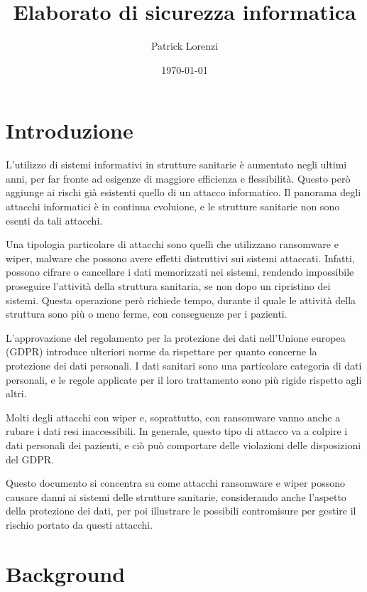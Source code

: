 \documentclass[12pt]{article}
\title{Elaborato di sicurezza informatica}
\author{Patrick Lorenzi}
\date{\today}
\begin{document}
\maketitle{}    
\newpage
\tableofcontents
\newpage

\section{Introduzione}

L'utilizzo di sistemi informativi in strutture sanitarie è aumentato negli ultimi anni, per far fronte ad esigenze di maggiore efficienza e flessibilità. Questo però aggiunge ai rischi già esistenti quello di un attacco informatico. Il panorama degli attacchi informatici è in continua evoluione, e le strutture sanitarie non sono esenti da tali attacchi. 

Una tipologia particolare di attacchi sono quelli che utilizzano ransomware e wiper, malware che possono avere effetti distruttivi sui sistemi attaccati. Infatti, possono cifrare o cancellare i dati memorizzati nei sistemi, rendendo impossibile proseguire l'attività della struttura sanitaria, se non dopo un ripristino dei sistemi. Questa operazione però richiede tempo, durante il quale le attività della struttura sono più o meno ferme, con conseguenze per i pazienti.

L'approvazione del regolamento per la protezione dei dati nell'Unione europea (GDPR) introduce ulteriori norme da rispettare per quanto concerne la protezione dei dati personali. I dati sanitari sono una particolare categoria di dati personali, e le regole applicate per il loro trattamento sono più rigide rispetto agli altri.

Molti degli attacchi con wiper e, soprattutto, con ransomware vanno anche a rubare i dati resi inaccessibili. In generale, questo tipo di attacco va a colpire i dati personali dei pazienti, e ciò può comportare delle violazioni delle disposizioni del GDPR.

Questo documento si concentra su come attacchi ransomware e wiper possono causare danni ai sistemi delle strutture sanitarie, considerando anche l'aspetto della protezione dei dati, per poi illustrare le possibili contromisure per gestire il rischio portato da questi attacchi.

\newpage

\section{Background}
\end{document}
